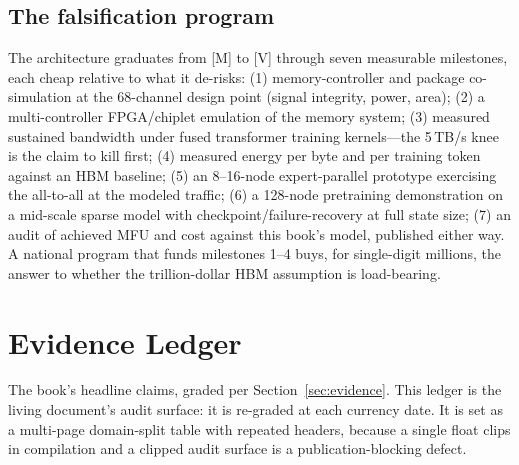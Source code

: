 \section{The falsification program}

The architecture graduates from [M] to [V] through seven measurable milestones, each cheap relative to what it de-risks: (1) memory-controller and package co-simulation at the 68-channel design point (signal integrity, power, area); (2) a multi-controller FPGA/chiplet emulation of the memory system; (3) measured sustained bandwidth under fused transformer training kernels---the 5\,TB/s knee is the claim to kill first; (4) measured energy per byte and per training token against an HBM baseline; (5) an 8--16-node expert-parallel prototype exercising the all-to-all at the modeled traffic; (6) a 128-node pretraining demonstration on a mid-scale sparse model with checkpoint/failure-recovery at full state size; (7) an audit of achieved MFU and cost against this book's model, published either way. A national program that funds milestones 1--4 buys, for single-digit millions, the answer to whether the trillion-dollar HBM assumption is load-bearing.




\chapter{Evidence Ledger}
\label{app:evidence}

The book's headline claims, graded per Section~\ref{sec:evidence}. This ledger is the living document's audit surface: it is re-graded at each currency date. It is set as a multi-page domain-split table with repeated headers, because a single float clips in compilation and a clipped audit surface is a publication-blocking defect.

